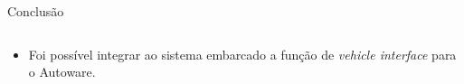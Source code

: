 \documentclass{if-beamer}
\begin{document}
\begin{frame}{Conclusão}
\begin{columns}
\begin{column}{0.435\textwidth}
		\end{column}
		
	\end{columns}

\pause

	\begin{block}{}
		
		\begin{itemize}
			\item Foi possível integrar ao sistema embarcado a função de \textit{vehicle interface} para o Autoware.
			
		\end{itemize}
		
	\end{block}
	
\end{frame}
\end{document}

